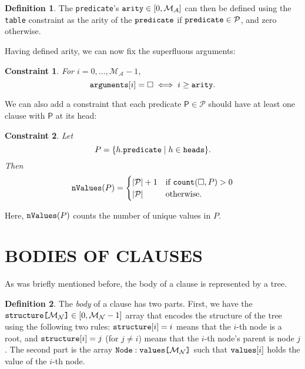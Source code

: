 \documentclass[letterpaper]{article}
\newtheorem{constraint}{Constraint}
\theoremstyle{definition}
\newtheorem{definition}{Definition}
\newcommand{\variable}[1]{\texttt{\textup{#1}}}
\newcommand{\arrayd}[3]{\variable{{#1}[}{#2}\variable{]} \in {#3}}
\newcommand{\arrayt}[3]{\variable{{#3}} : \variable{{#1}[}{#2}\variable{]}}
\newcommand{\predicates}{\mathcal{P}}
\newcommand{\maxArity}{\mathcal{M}_{\mathcal{A}}}
\newcommand{\maxNumNodes}{\mathcal{M}_{\mathcal{N}}}
\begin{document}
\begin{definition} \label{def:arity}
  The \variable{predicate}'s $\variable{arity} \in [0, \maxArity{}]$ can then be
  defined using the \variable{table} constraint as the arity of the
  $\variable{predicate}$ if $\variable{predicate} \in \predicates{}$, and zero
  otherwise.
\end{definition}

Having defined arity, we can now fix the superfluous arguments:

\begin{constraint} \label{constr:arity}
  For $i = 0, \dots, \maxArity{} - 1$,
  \[
    \variable{arguments}[i] = \Box \iff i \ge \variable{arity}.
  \]
\end{constraint}

We can also add a constraint that each predicate $\mathsf{P} \in \predicates{}$
should have at least one clause with $\mathsf{P}$ at its head:

\begin{constraint}
Let
  \[
    P = \{ h.\variable{predicate} \mid h \in \variable{heads} \}.
  \]
  Then
  \[
    \variable{nValues}(P) =
    \begin{cases}
      |\predicates{}| + 1 & \text{if } \variable{count}(\Box, P) > 0 \\
      |\predicates{}| & \text{otherwise.}
    \end{cases}
  \]
\end{constraint}

Here, $\variable{nValues}(P)$ counts the number of unique values in $P$.

\section{BODIES OF CLAUSES} \label{sec:bodies}

As was briefly mentioned before, the body of a clause is represented by a tree.

\begin{definition}
  The \emph{body} of a clause has two parts. First, we have the
  $\arrayd{structure}{\maxNumNodes{}}{[0, \maxNumNodes{} - 1]}$ array that
  encodes the structure of the tree using the following two rules:
  $\variable{structure}[i] = i$ means that the $i$-th node is a root, and
  $\variable{structure}[i] = j$ (for $j \ne i$) means that the $i$-th node's
  parent is node $j$. The second part is the array
  $\arrayt{values}{\maxNumNodes{}}{Node}$ such that $\variable{values}[i]$ holds
  the value of the $i$-th node.
\end{definition}
\end{document}
